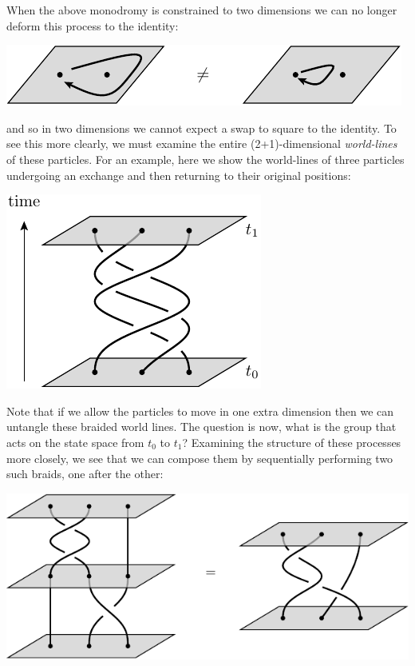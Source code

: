 When the above monodromy is constrained to two dimensions
we can no longer deform this process to the identity:
\begin{center}
\includegraphics[]{pic-monodromy2d.pdf}
\end{center}
and so in two dimensions we cannot expect a swap to square to the identity.
To see this more clearly,
we must examine the entire (2+1)-dimensional \emph{world-lines} of these particles.
For an example, here we show the world-lines of three particles undergoing an exchange and then
returning to their original positions:
\begin{center}
\includegraphics[]{pic-braid-worldlines.pdf}
\end{center}
Note that if we allow the particles to move in one extra
dimension then we can untangle these braided world lines.
The question is now, what is the group that acts on the
state space from $t_0$ to $t_1$?
Examining the structure of these processes more closely,
we see that we can compose them by sequentially performing
two such braids, one after the other:
\begin{center}
\includegraphics[]{pic-braid-compose.pdf}
\end{center}
